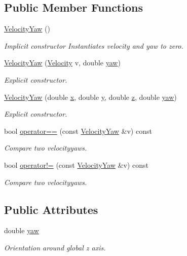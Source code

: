 \subsection*{Public Member Functions}
\begin{DoxyCompactItemize}
\item 
\hyperlink{structVelocityYaw_a1aa3de4b3e3d7510c233ebd54b2fe79d}{Velocity\-Yaw} ()
\begin{DoxyCompactList}\small\item\em Implicit constructor Instantiates velocity and yaw to zero. \end{DoxyCompactList}\item 
\hyperlink{structVelocityYaw_a21a3493e39f5256972abe5f97315c80b}{Velocity\-Yaw} (\hyperlink{structVelocity}{Velocity} v, double \hyperlink{structVelocityYaw_a5bef45a2807a9814495080d2e5603ce4}{yaw})
\begin{DoxyCompactList}\small\item\em Explicit constructor. \end{DoxyCompactList}\item 
\hyperlink{structVelocityYaw_ab4ebb3f3782c9541dafb73c4e3e82196}{Velocity\-Yaw} (double \hyperlink{structVelocity_a99a9f9580c8a025a2c7a18890993b56a}{x}, double \hyperlink{structVelocity_ae1282d20e14cc4be4aac24ab4e1e3e5c}{y}, double \hyperlink{structVelocity_aaebcd198674f7adcb61f9bb981dab465}{z}, double \hyperlink{structVelocityYaw_a5bef45a2807a9814495080d2e5603ce4}{yaw})
\begin{DoxyCompactList}\small\item\em Explicit constructor. \end{DoxyCompactList}\item 
bool \hyperlink{structVelocityYaw_ad546c6bf2a5483fdb21387e0df040acb}{operator==} (const \hyperlink{structVelocityYaw}{Velocity\-Yaw} \&v) const 
\begin{DoxyCompactList}\small\item\em Compare two velocityyaws. \end{DoxyCompactList}\item 
bool \hyperlink{structVelocityYaw_a239edcca362f6a0fababa7fb1767e7b6}{operator!=} (const \hyperlink{structVelocityYaw}{Velocity\-Yaw} \&v) const 
\begin{DoxyCompactList}\small\item\em Compare two velocityyaws. \end{DoxyCompactList}\end{DoxyCompactItemize}
\subsection*{Public Attributes}
\begin{DoxyCompactItemize}
\item 
double \hyperlink{structVelocityYaw_a5bef45a2807a9814495080d2e5603ce4}{yaw}
\begin{DoxyCompactList}\small\item\em Orientation around global z axis. \end{DoxyCompactList}\end{DoxyCompactItemize}


